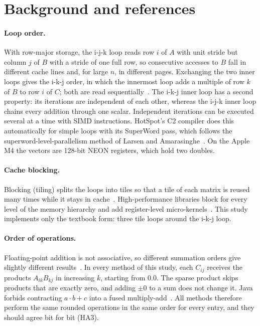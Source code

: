 \documentclass[11pt,a4paper]{article}
\begin{document}
\section{Background and references}

\paragraph{Loop order.} With row-major storage, the i-j-k loop reads row $i$ of
$A$ with unit stride but column $j$ of $B$ with a stride of one full row, so
consecutive accesses to $B$ fall in different cache lines and, for large $n$,
in different pages. Exchanging the two inner loops gives the i-k-j order, in
which the innermost loop adds a multiple of row $k$ of $B$ to row $i$ of $C$;
both are read sequentially~\cite{bryant2016,drepper2007}. The i-k-j inner loop
has a second property: its iterations are independent of each other, whereas
the i-j-k inner loop chains every addition through one scalar. Independent
iterations can be executed several at a time with SIMD instructions. HotSpot's
C2 compiler does this automatically for simple loops with its SuperWord pass,
which follows the superword-level-parallelism method of Larsen and
Amarasinghe~\cite{larsen2000}. On the Apple M4 the vectors are 128-bit NEON
registers, which hold two doubles.

\paragraph{Cache blocking.} Blocking (tiling) splits the loops into tiles so
that a tile of each matrix is reused many times while it stays in
cache~\cite{lam1991}. High-performance libraries block for every level of the
memory hierarchy and add register-level micro-kernels~\cite{goto2008}. This
study implements only the textbook form: three tile loops around the i-k-j
loop.

\paragraph{Order of operations.} Floating-point addition is not associative, so
different summation orders give slightly different results~\cite{higham2002}.
In every method of this study, each $C_{ij}$ receives the products
$A_{ik}B_{kj}$ in increasing $k$, starting from $0.0$. The sparse product skips
products that are exactly zero, and adding $\pm0$ to a sum does not change it.
Java forbids contracting $a\cdot b+c$ into a fused multiply-add~\cite{jep306}.
All methods therefore perform the same rounded operations in the same order
for every entry, and they should agree bit for bit (HA3).
\end{document}
